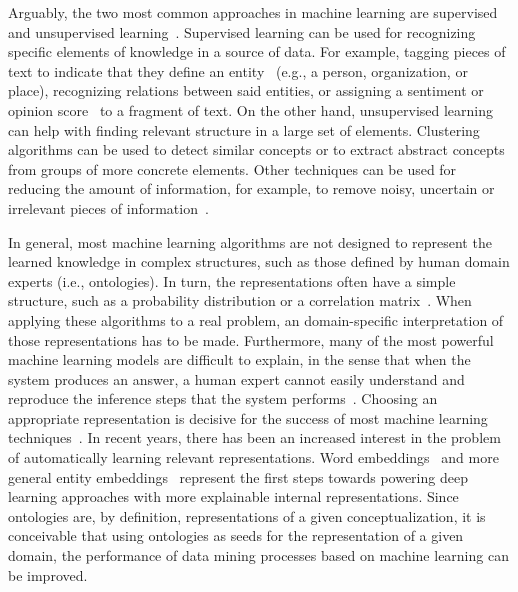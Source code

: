 	Arguably, the two most common approaches in machine learning are supervised and unsupervised learning~\cite{kevin2012machine}.
    Supervised learning can be used for recognizing specific elements of knowledge in a source of data. For example, tagging
    pieces of text to indicate that they define an entity~\cite{nadeau2007survey} (e.g., a person, organization, or place), recognizing relations between
    said entities, or assigning a sentiment or opinion score~\cite{liu2012sentiment} to a fragment of text. On the other hand, unsupervised learning
    can help with finding relevant structure in a large set of elements. Clustering algorithms can be used to detect similar
    concepts or to extract abstract concepts from groups of more concrete elements. Other techniques can be used for reducing
    the amount of information, for example, to remove noisy, uncertain or irrelevant pieces of
    information~\cite{bingham2001random}.

    In general, most machine learning algorithms are not designed to represent the learned knowledge in complex structures,
    such as those defined by human domain experts (i.e., ontologies). In turn, the representations often have a simple structure, such
 	as a probability distribution or a correlation matrix~\cite{bengio2013representation}.
    When applying these algorithms to a real problem, an domain-specific
    interpretation of those representations has to be made.
    Furthermore, many of the most powerful machine learning models are difficult to explain, in the sense
    that when the system produces an answer, a human expert cannot easily understand and reproduce the inference steps
    that the system performs~\cite{olden2002illuminating}.
    Choosing an appropriate representation is decisive for the success of most machine learning techniques~\cite{bengio2012deep}.
    In recent years, there has been an increased interest in the problem of automatically learning relevant representations.
    Word embeddings~\cite{mikolov} and more general entity embeddings~\cite{hu2015entity} represent the first steps towards powering
    deep learning approaches with more explainable internal representations.
    Since ontologies are, by definition, representations of a given conceptualization, it is conceivable that using ontologies
    as seeds for the representation of a given domain, the performance of data mining processes based on machine learning can
    be improved.

